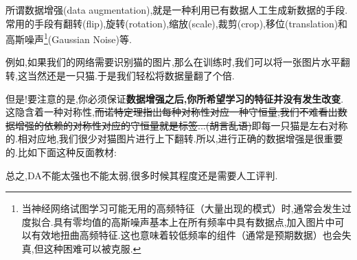 所谓数据增强(data augmentation),就是一种利用已有数据人工生成新数据的手段.常用的手段有翻转(flip),旋转(rotation),缩放(scale),裁剪(crop),移位(translation)和高斯噪声\footnote{当神经网络试图学习可能无用的高频特征（大量出现的模式）时,通常会发生过度拟合.具有零均值的高斯噪声基本上在所有频率中具有数据点,加入图片中可以有效地扭曲高频特征.这也意味着较低频率的组件（通常是预期数据）也会失真,但这种困难可以被克服.}(Gaussian Noise)等.

例如,如果我们的网络需要识别猫的图片,那么在训练时,我们可以将一张图片水平翻转,这当然还是一只猫.于是我们轻松将数据量翻了个倍.

但是!要注意的是,你必须保证\textbf{数据增强之后,你所希望学习的特征并没有发生改变}.这隐含着一种对称性,\sout{而诺特定理指出每种对称性对应一种守恒量,我们不难看出数据增强的依赖的对称性对应的守恒量就是标签...(胡言乱语)}即每一只猫是左右对称的.相对应地,我们很少对猫图片进行上下翻转.所以,进行正确的数据增强是很重要的.比如下面这种反面教材:

\begin{figure}[htbp]
	\centering
\end{figure}

总之,DA不能太强也不能太弱,很多时候其程度还是需要人工评判.

